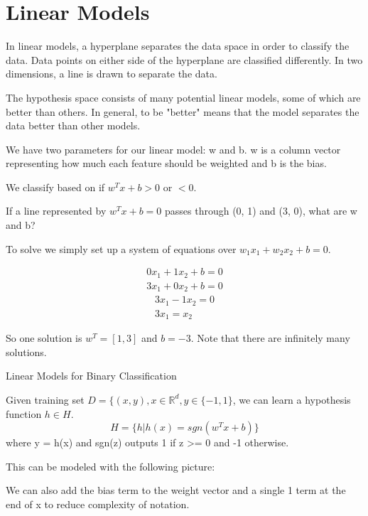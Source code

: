 \chapter{Linear Models}

In linear models, a hyperplane separates the data space in order to classify the data. Data points on either side of the hyperplane are classified differently. In two dimensions, a line is drawn to separate the data.

\begin{center}
\end{center}

The hypothesis space consists of many potential linear models, some of which are better than others. In general, to be "better" means that the model separates the data better than other models.

We have two parameters for our linear model: w and b. w is a column vector representing how much each feature should be weighted and b is the bias.

\begin{center}
\end{center}

We classify based on if $w^Tx + b > 0$ or $ < 0$.

\begin{example}
    If a line represented by $w^Tx + b = 0$ passes through (0, 1) and (3, 0), what are w and b?

    To solve we simply set up a system of equations over $w_1x_1 + w_2x_2 + b = 0$.

    \begin{align*}
        0x_1 + 1x_2 + b = 0 \\
        3x_1 + 0x_2 + b = 0
    \end{align*}
    \begin{align*}
        3x_1 - 1x_2 = 0 \\
        3x_1 = x_2
    \end{align*}

    So one solution is $w^T = [1, 3]$ and $b = -3$. Note that there are infinitely many solutions.
\end{example}

\begin{definition}
    Linear Models for Binary Classification

    Given training set $D = \{(x, y), x \in \mathbb{R}^d, y \in \{-1, 1\}$, we can learn a hypothesis function $h \in H$.
    \[
        H = \{h | h(x) = sgn(w^Tx + b)\}  
    \]
    where y = h(x) and sgn(z) outputs 1 if z >= 0 and -1 otherwise. 

    This can be modeled with the following picture:
    \begin{center}
    \end{center}

    We can also add the bias term to the weight vector and a single 1 term at the end of x to reduce complexity of notation.
\end{definition}

